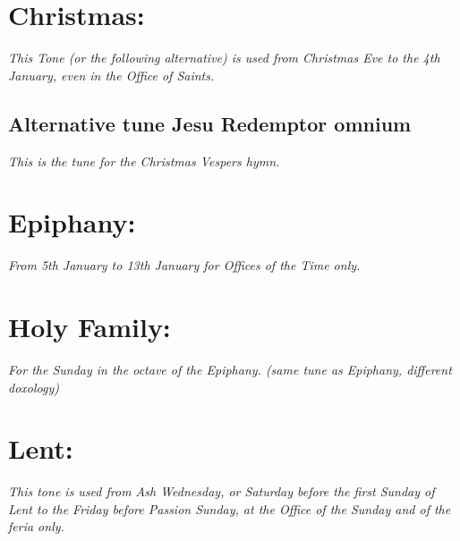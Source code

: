 \documentclass[a5paper,12pt,twoside,openany]{memoir}
\newcommand\rubrics[1]{\textit{#1}}
\begin{document}
\newpage

\section{Christmas:}

\label{TLchristmas}
\rubrics{This Tone (or the following alternative) is used from Christmas Eve to the 4th January, even in the Office of Saints.}


\subsection{Alternative tune Jesu Redemptor omnium}

\rubrics{This is the tune for the Christmas Vespers hymn.}


\goodbreak

\section{Epiphany:}

\rubrics{From 5th January to 13th January for Offices of the Time only.}


\goodbreak


\section{Holy Family:}

\rubrics{For the Sunday in the octave of the Epiphany. (same tune as Epiphany, different doxology)}


\goodbreak



\section{Lent:}

\rubrics{This tone is used from Ash Wednesday, or Saturday before the first Sunday of Lent to the Friday before Passion Sunday, at the Office of the Sunday and of the feria only.}

\end{document}
